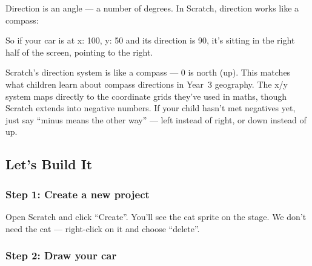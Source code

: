 \documentclass[11pt,a4paper]{article}
\begin{document}
Direction is an angle --- a number of degrees. In Scratch, direction works like a compass:

\begin{center}
\end{center}

So if your car is at x: 100, y: 50 and its direction is 90, it's sitting in the right half of the screen, pointing to the right.

\begin{parentbox}
Scratch's direction system is like a compass --- 0 is north (up). This matches what children learn about compass directions in Year~3 geography. The x/y system maps directly to the coordinate grids they've used in maths, though Scratch extends into negative numbers. If your child hasn't met negatives yet, just say ``minus means the other way'' --- left instead of right, or down instead of up.
\end{parentbox}

\subsection{Let's Build It}

\subsubsection{Step 1: Create a new project}

Open Scratch and click ``Create''. You'll see the cat sprite on the stage. We don't need the cat --- right-click on it and choose ``delete''.

\subsubsection{Step 2: Draw your car}
\end{document}
